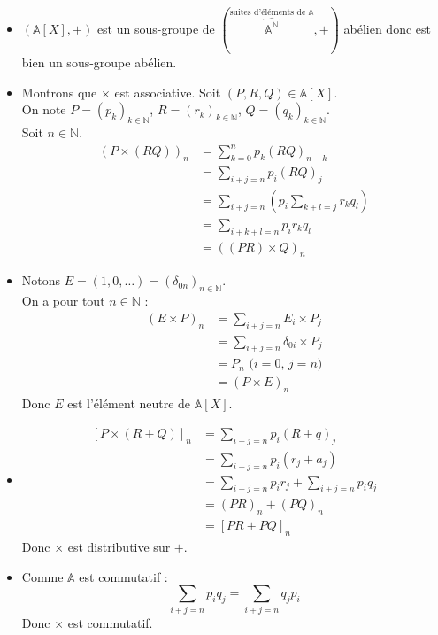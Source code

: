 \documentclass[titlepage, twoside]{report}
\begin{document}
\begin{itemize}
    \item $(\mathbb{A}[X], +)$ est un sous-groupe de $(\overbrace{\mathbb{A}^{\mathbb{N}}}^{\text{suites d'éléments de } \mathbb{A}}, +)$ abélien donc est bien un sous-groupe abélien. 
    
    \item Montrons que $\times$ est associative. Soit $(P,R,Q) \in \mathbb{A}[X]$. \\
    On note $P = (p_k)_{k \in \mathbb{N}}$, $R = (r_k)_{k \in \mathbb{N}}$, $Q = (q_k)_{k \in \mathbb{N}}$. \\
    Soit $n \in \mathbb{N}$. 
    \begin{align*}
        (P \times (RQ))_n &= \sum_{k=0}^{n} p_k (RQ)_{n-k} \\
        &= \sum_{i+j=n} p_i (RQ)_j \\
        &= \sum_{i+j=n} \left( p_i \sum_{k+l=j} r_k q_l \right) \\
        &= \sum_{i+k+l=n} p_i r_k q_l \\
        &= ((PR) \times Q)_n
    \end{align*}

    \item Notons $E = (1, 0, \ldots) = (\delta_{0n})_{n\in \mathbb{N}}$. \\
    On a pour tout $n \in \mathbb{N}$ : 
    \begin{align*}
        (E \times P)_n &= \sum_{i+j=n} E_i \times P_j \\
        &= \sum_{i+j=n} \delta_{0i}\times P_j \\
        &= P_n \text{ ($i=0$, $j=n$)} \\
        &= (P \times E)_n 
    \end{align*}
    Donc $E$ est l'élément neutre de $\mathbb{A}[X]$. 

    \item 
    \begin{align*}
        \left[ P \times (R + Q) \right]_n &= \sum_{i+j=n} p_i (R + q)_j \\
        &= \sum_{i+j=n} p_i (r_j + a_j) \\
        &= \sum_{i+j=n} p_i r_j + \sum_{i+j=n} p_i q_j \\
        &= (PR)_n + (PQ)_n \\
        &= [PR + PQ]_n
    \end{align*}
    Donc $\times$ est distributive sur $+$. 

    \item Comme $\mathbb{A}$ est commutatif : 
    $$\sum_{i+j=n} p_i q_j = \sum_{i+j=n} q_j p_i$$
    Donc $\times$ est commutatif. 
\end{itemize}
\end{document}
